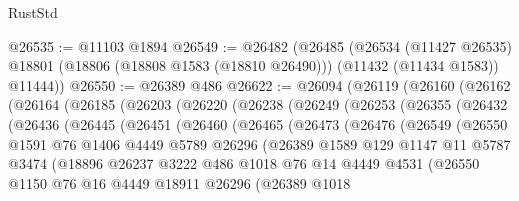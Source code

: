 \begin{lexlean}{RustStd}
\begin{coremodule}
@26535 := @11103 @1894
@26549 := @26482
    (@26485
      (@26534
        (@11427 @26535)
        @18801
        (@18806 (@18808 @1583 (@18810 @26490)))
        (@11432 (@11434 @1583))
        @11444))
@26550 := @26389 @486
@26622 := @26094
    (@26119
      (@26160
        (@26162
          (@26164
            (@26185
              (@26203
                (@26220
                  (@26238
                    (@26249
                      (@26253
                        (@26355
                          (@26432
                            (@26436
                              (@26445
                                (@26451
                                  (@26460
                                    (@26465
                                      (@26473
                                        (@26476
                                          (@26549
                                            (@26550
                                              @1591
                                              @76
                                              @1406
                                              @4449
                                              @5789
                                              @26296
                                              (@26389
                                                @1589
                                                @129
                                                @1147
                                                @11
                                                @5787
                                                @3474
                                                (@18896
                                                  @26237
                                                  @3222
                                                  @486
                                                  @1018
                                                  @76
                                                  @14
                                                  @4449
                                                  @4531
                                                  (@26550
                                                    @1150
                                                    @76
                                                    @16
                                                    @4449
                                                    @18911
                                                    @26296
                                                    (@26389
                                                      @1018

\end{coremodule}
\end{lexlean}
